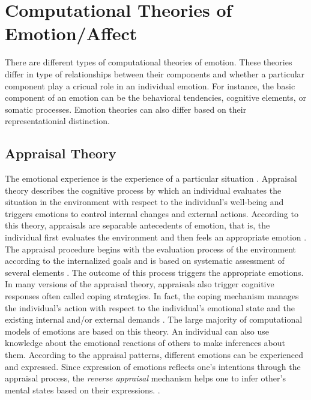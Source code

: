 \documentclass[11pt]{article}
\begin{document}
\section{Computational Theories of Emotion/Affect}

There are different types of computational theories of emotion. These theories
differ in type of relationships between their components and whether a
particular component play a cricual role in an individual emotion. For instance,
the basic component of an emotion can be the behavioral tendencies, cognitive
elements, or somatic processes. Emotion theories can also differ based on their
representationial distinction.

\subsection{Appraisal Theory}
\label{sec:appraisal-theory}

The emotional experience is the experience of a particular situation
\cite{frijda:emotions}. Appraisal theory describes the cognitive process by
which an individual evaluates the situation in the environment with respect to
the individual's well-being and triggers emotions to control internal changes
and external actions. According to this theory, appraisals are separable
antecedents of emotion, that is, the individual first evaluates the environment
and then feels an appropriate emotion \cite{scherer:appraisal-processes}. The
appraisal procedure begins with the evaluation process of the environment
according to the internalized goals and is based on systematic assessment of
several elements \cite{scherer:sequential-appraisal-process}. The outcome of
this process triggers the appropriate emotions. In many versions of the
appraisal theory, appraisals also trigger cognitive responses often called
coping strategies. In fact, the coping mechanism manages the individual's
action with respect to the individual's emotional state and the existing
internal and/or external demands \cite{folkman:coping-pitfalls-promise}. The
large majority of computational models of emotions are based on this theory. An
individual can also use knowledge about the emotional reactions of others to
make inferences about them. According to the appraisal patterns, different
emotions can be experienced and expressed. Since expression of emotions reflects
one's intentions through the appraisal process, the \textit{reverse appraisal}
mechanism helps one to infer other's mental states based on their expressions.
\cite{gratch:reverse-appraisal, hareli:emotional-reaction-perception}.
\end{document}
